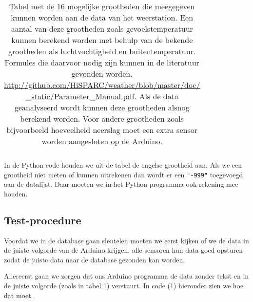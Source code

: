 \begin{center}
\begin{table}
\begin{tabular}{ | l | l | l|}
   \end{tabular}
   \caption{Tabel met de 16 mogelijke grootheden die meegegeven kunnen
   worden aan de data van het weerstation. Een aantal van deze
   grootheden zoals gevoelstemperatuur kunnen berekend worden met behulp
   van de bekende grootheden als luchtvochtigheid en buitentemperatuur.
   Formules die daarvoor nodig zijn kunnen in de literatuur gevonden
   worden.
   \protect\url{http://github.com/HiSPARC/weather/blob/master/doc/
   _static/Parameter_Manual.pdf}. Als de data geanalyseerd wordt kunnen
   deze grootheden alsnog berekend worden. Voor andere grootheden zoals
   bijvoorbeeld hoeveelheid neerslag moet een extra sensor worden
   aangesloten op de Arduino.}
   \label{table:grootheden}
\end{table}
\end{center}

In de Python code houden we uit de tabel de engelse grootheid aan. Als we een grootheid
niet meten of kunnen uitrekenen dan wordt er een \verb|"-999"| toegevoegd aan de datalijst.
Daar moeten we in het Python programma ook rekening mee houden.

\subsection{Test-procedure} 
Voordat we in de database gaan sleutelen moeten we eerst kijken of we de
data in de juiste volgorde van de Arduino krijgen, alle sensoren hun data goed opsturen
zodat de juiste data naar de \hisparc database gezonden kan worden.

Allereerst gaan we zorgen dat ons Arduino programma de data zonder tekst en 
in de juiste volgorde (zoals in tabel \ref{table:grootheden}) verstuurt. 
In code (1) hieronder zien we hoe dat moet.

